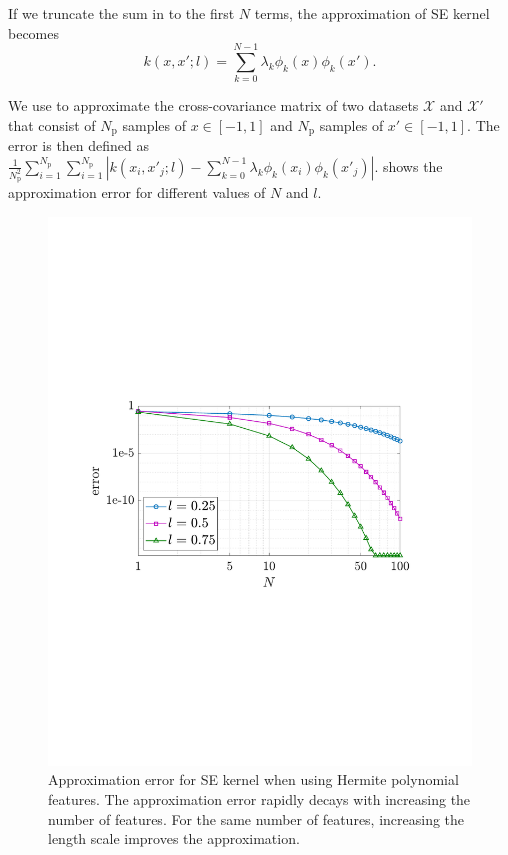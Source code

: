 \documentclass{article}
\begin{document}
If we truncate the sum in  to the first $N$ terms, the approximation of SE kernel becomes
\begin{equation}\label{eqn622}
	k(x, x'; l) = \sum_{k=0}^{N-1} \lambda_k \phi_k(x) \phi_k(x').
\end{equation}

We use  to approximate the cross-covariance matrix of two datasets $\mathcal{X}$ and $\mathcal{X}'$ that consist of $N_\text{p}$ samples of $x \in [-1,1]$ and $N_\text{p}$ samples of $x' \in [-1,1]$.
The error is then defined as $\frac{1}{N_\text{p}^2} \sum_{i=1}^{N_\text{p}} \sum_{i=1}^{N_\text{p}}| k(x_i,x'_j;l) -  \sum_{k=0}^{N-1} \lambda_k \phi_k(x_i) \phi_k(x'_j)|$.
 shows the approximation error for different values of $N$ and $l$.

\begin{figure}[t]
	\centering
	\includegraphics[width=0.6\linewidth]{img/approxError.pdf}
	\caption{Approximation error for SE kernel when using Hermite polynomial features. The approximation error rapidly decays with increasing the number of features. For the same number of features, increasing the length scale improves the approximation.}
	\label{fig:approxError}
\end{figure}
\end{document}
